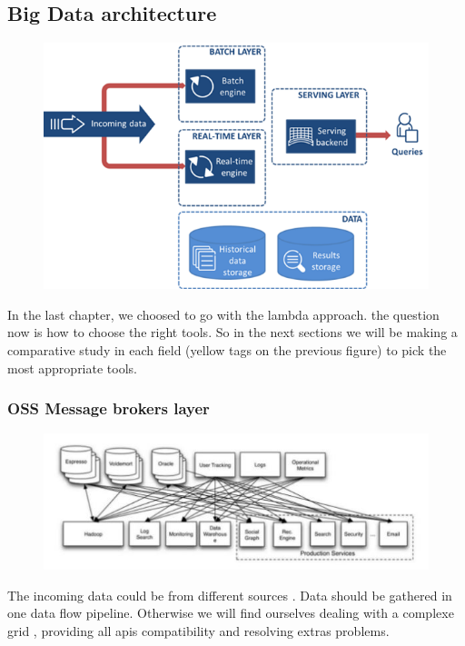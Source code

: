 \subsection{Big Data architecture}
\label{sec:sec01}

\begin{figure}[h!]
	\centering
	\includegraphics[height=0.4\textheight]{fig01/lambda}
	\label{fig:FilialesEtClients}
\end{figure}

In the last chapter, we choosed to go with the lambda approach. the question now is how to choose the right tools. So in
the next sections we will be making a comparative study in each field (yellow tags on the previous figure) to pick the most appropriate tools.

\subsubsection{OSS Message brokers layer}
\label{sec:sec01}
\begin{figure}[h!]
	\centering
	\includegraphics[height=0.2\textheight]{fig01/MessageBrokerNecessity}
	\label{fig:FilialesEtClients}
\end{figure}
The incoming data could be from different sources . Data should be gathered in one data flow pipeline.
Otherwise we will find ourselves dealing with a complexe grid , providing all apis compatibility and resolving 
extras problems.


